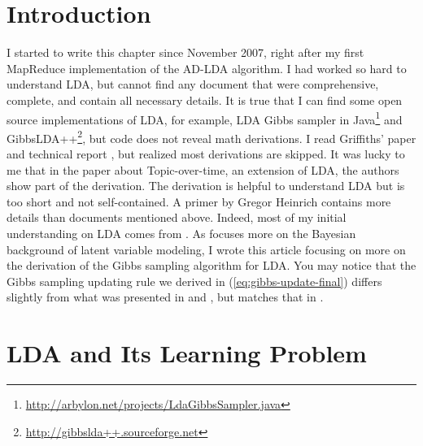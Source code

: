 
\section{Introduction}

I started to write this chapter since November 2007, right after my
first MapReduce implementation of the AD-LDA
algorithm\cite{dist-lda-gibbs}.  I had worked so hard to understand
LDA, but cannot find any document that were comprehensive, complete,
and contain all necessary details.  It is true that I can find some
open source implementations of LDA, for example, LDA Gibbs sampler in
Java\footnote{\url{http://arbylon.net/projects/LdaGibbsSampler.java}}
and GibbsLDA++\footnote{\url{http://gibbslda++.sourceforge.net}}, but
code does not reveal math derivations.  I read Griffiths' paper
\cite{lda_gibbs} and technical report \cite{lda-gibbs-techreport}, but
realized most derivations are skipped.  It was lucky to me that in the
paper about Topic-over-time\cite{tot}, an extension of LDA, the
authors show part of the derivation.  The derivation is helpful to
understand LDA but is too short and not self-contained.  A primer
\cite{heinrich} by Gregor Heinrich contains more details than
documents mentioned above.  Indeed, most of my initial understanding
on LDA comes from \cite{heinrich}.  As \cite{heinrich} focuses more on
the Bayesian background of latent variable modeling, I wrote this
article focusing on more on the derivation of the Gibbs sampling
algorithm for LDA.  You may notice that the Gibbs sampling updating
rule we derived in (\ref{eq:gibbs-update-final}) differs slightly from
what was presented in \cite{lda-gibbs-techreport} and \cite{heinrich},
but matches that in \cite{tot}.


\section{LDA and Its Learning Problem}


